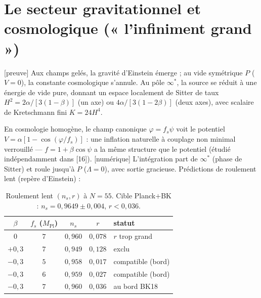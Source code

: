 \documentclass[11pt,a4paper]{article}
\newcommand{\statut}[1]{{\footnotesize\textsf{[#1]}}}
\newcommand{\Mpl}{M_{\mathrm{Pl}}}
\theoremstyle{definition}
\begin{document}
\section{Le secteur gravitationnel et cosmologique (« l'infiniment grand »)}\label{sec:cosmo}
\statut{preuve} Aux champs gel\'es, la gravit\'e d'Einstein \'emerge ; au vide sym\'etrique $P$
($V=0$), la constante cosmologique s'annule. Au p\^ole $\infty^*$, la source se r\'eduit \`a une
\'energie de vide pure, donnant un espace localement de Sitter de taux
$H^2=2\alpha/[3(1-\beta)]$ (un axe) ou $4\alpha/[3(1-2\beta)]$ (deux axes), avec scalaire de
Kretschmann fini $K=24H^4$.

En cosmologie homog\`ene, le champ canonique $\varphi=f_s\psi$ voit le potentiel
$V=\alpha[1-\cos(\varphi/f_s)]$ : une inflation naturelle \`a couplage non minimal verrouill\'e
--- $f=1+\beta\cos\psi$ a la m\^eme structure que le potentiel (\'etudi\'e ind\'ependamment dans
[16]). \statut{num\'erique} L'int\'egration part de $\infty^*$ (phase de Sitter) et roule
jusqu'\`a $P$ ($\Lambda=0$), avec sortie gracieuse. Pr\'edictions de roulement lent (repère
d'Einstein) :

\begin{table}[h]\centering\small
\begin{tabular}{ccccl}
\toprule
$\beta$ & $f_s$ ($\Mpl$) & $n_s$ & $r$ & statut\\
\midrule
$0$ & $7$ & $0{,}960$ & $0{,}078$ & $r$ trop grand\\
$+0{,}3$ & $7$ & $0{,}949$ & $0{,}128$ & exclu\\
$-0{,}3$ & $5$ & $0{,}958$ & $0{,}017$ & compatible (bord)\\
$-0{,}3$ & $6$ & $0{,}959$ & $0{,}027$ & compatible (bord)\\
$-0{,}3$ & $7$ & $0{,}960$ & $0{,}036$ & au bord BK18\\
\bottomrule
\end{tabular}
\caption{\small Roulement lent $(n_s,r)$ \`a $N=55$. Cible Planck$+$BK :
$n_s=0{,}9649\pm0{,}004$, $r<0{,}036$.}\label{tab:nsr}
\end{table}
\end{document}
